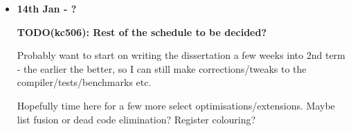 \documentclass[12pt]{article}
\newcommand\todo[1]{\textbf{TODO(kc506): #1}}
\begin{document}
\begin{itemize}
{}
\item
{
    \textbf{14th Jan - ?}

    \todo{Rest of the schedule to be decided?}

    Probably want to start on writing the dissertation a few weeks into 2nd term - the earlier the better, so I can
    still make corrections/tweaks to the compiler/tests/benchmarks etc.

    Hopefully time here for a few more select optimisations/extensions. Maybe list fusion or dead code elimination?
    Register colouring?

}
\end{itemize}
\end{document}
